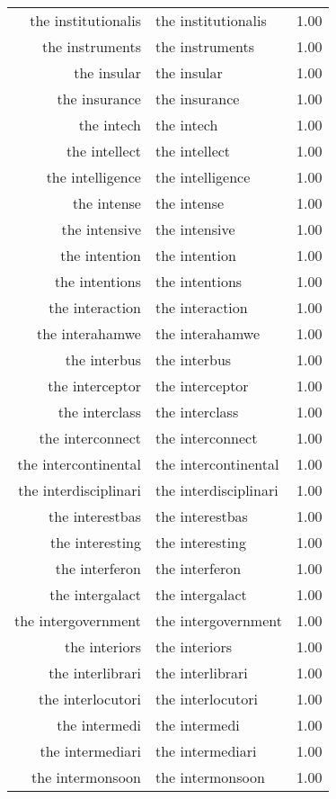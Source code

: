 \begin{table}[ht]
\begin{tabular}{rlr}
  the institutionalis & the institutionalis & 1.00 \\ 
  the instruments & the instruments & 1.00 \\ 
  the insular & the insular & 1.00 \\ 
  the insurance & the insurance & 1.00 \\ 
  the intech & the intech & 1.00 \\ 
  the intellect & the intellect & 1.00 \\ 
  the intelligence & the intelligence & 1.00 \\ 
  the intense & the intense & 1.00 \\ 
  the intensive & the intensive & 1.00 \\ 
  the intention & the intention & 1.00 \\ 
  the intentions & the intentions & 1.00 \\ 
  the interaction & the interaction & 1.00 \\ 
  the interahamwe & the interahamwe & 1.00 \\ 
  the interbus & the interbus & 1.00 \\ 
  the interceptor & the interceptor & 1.00 \\ 
  the interclass & the interclass & 1.00 \\ 
  the interconnect & the interconnect & 1.00 \\ 
  the intercontinental & the intercontinental & 1.00 \\ 
  the interdisciplinari & the interdisciplinari & 1.00 \\ 
  the interestbas & the interestbas & 1.00 \\ 
  the interesting & the interesting & 1.00 \\ 
  the interferon & the interferon & 1.00 \\ 
  the intergalact & the intergalact & 1.00 \\ 
  the intergovernment & the intergovernment & 1.00 \\ 
  the interiors & the interiors & 1.00 \\ 
  the interlibrari & the interlibrari & 1.00 \\ 
  the interlocutori & the interlocutori & 1.00 \\ 
  the intermedi & the intermedi & 1.00 \\ 
  the intermediari & the intermediari & 1.00 \\ 
  the intermonsoon & the intermonsoon & 1.00 \\ 

\end{tabular}
\end{table}
